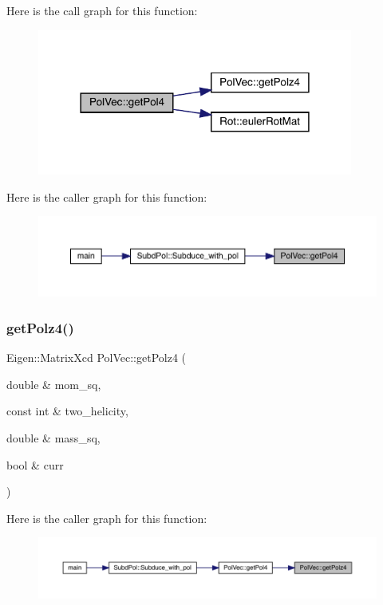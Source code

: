 Here is the call graph for this function\+:\nopagebreak
\begin{figure}[H]
\begin{center}
\leavevmode
\includegraphics[width=294pt]{d7/d0c/namespacePolVec_ade32426820c06c6df537464fc4ae9475_cgraph}
\end{center}
\end{figure}
Here is the caller graph for this function\+:\nopagebreak
\begin{figure}[H]
\begin{center}
\leavevmode
\includegraphics[width=350pt]{d7/d0c/namespacePolVec_ade32426820c06c6df537464fc4ae9475_icgraph}
\end{center}
\end{figure}
\mbox{\label{namespacePolVec_a447669c50a18d92dc7fc6b530588dc85}} 
\subsubsection{\texorpdfstring{getPolz4()}{getPolz4()}}
{\footnotesize\ttfamily Eigen\+::\+Matrix\+Xcd Pol\+Vec\+::get\+Polz4 (\begin{DoxyParamCaption}\item[{double \&}]{mom\+\_\+sq,  }\item[{const int \&}]{two\+\_\+helicity,  }\item[{double \&}]{mass\+\_\+sq,  }\item[{bool \&}]{curr }\end{DoxyParamCaption})}

Here is the caller graph for this function\+:\nopagebreak
\begin{figure}[H]
\begin{center}
\leavevmode
\includegraphics[width=350pt]{d7/d0c/namespacePolVec_a447669c50a18d92dc7fc6b530588dc85_icgraph}
\end{center}
\end{figure}

